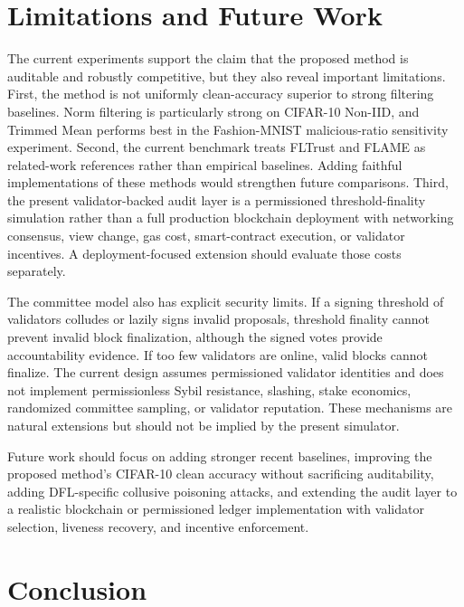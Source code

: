 \documentclass[preprint,authoryear,12pt]{elsarticle}
\begin{document}
\section{Limitations and Future Work}

The current experiments support the claim that the proposed method is auditable and robustly competitive, but they also reveal important limitations. First, the method is not uniformly clean-accuracy superior to strong filtering baselines. Norm filtering is particularly strong on CIFAR-10 Non-IID, and Trimmed Mean performs best in the Fashion-MNIST malicious-ratio sensitivity experiment. Second, the current benchmark treats FLTrust and FLAME as related-work references rather than empirical baselines. Adding faithful implementations of these methods would strengthen future comparisons. Third, the present validator-backed audit layer is a permissioned threshold-finality simulation rather than a full production blockchain deployment with networking consensus, view change, gas cost, smart-contract execution, or validator incentives. A deployment-focused extension should evaluate those costs separately.

The committee model also has explicit security limits. If a signing threshold of validators colludes or lazily signs invalid proposals, threshold finality cannot prevent invalid block finalization, although the signed votes provide accountability evidence. If too few validators are online, valid blocks cannot finalize. The current design assumes permissioned validator identities and does not implement permissionless Sybil resistance, slashing, stake economics, randomized committee sampling, or validator reputation. These mechanisms are natural extensions but should not be implied by the present simulator.

Future work should focus on adding stronger recent baselines, improving the proposed method's CIFAR-10 clean accuracy without sacrificing auditability, adding DFL-specific collusive poisoning attacks, and extending the audit layer to a realistic blockchain or permissioned ledger implementation with validator selection, liveness recovery, and incentive enforcement.

\section{Conclusion}
\end{document}
